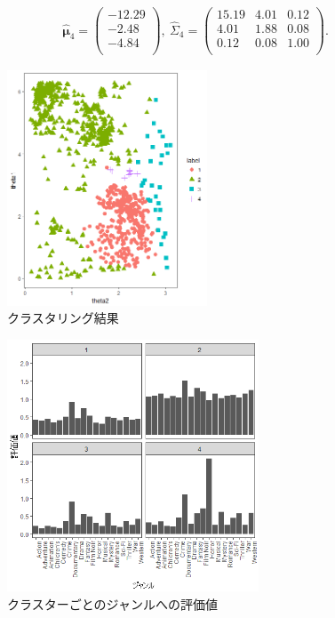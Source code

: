 \documentclass[a4paper,11pt]{jarticle}
\begin{document}
\begin{equation}
\begin{split}
\hat{\bm \mu}_4 = \begin{pmatrix} -12.29   \\ -2.48 \\ -4.84 \\ \end{pmatrix},\ 
\hat \Sigma_4 = \begin{pmatrix} 15.19 & 4.01 &  0.12 \\ 4.01 & 1.88 & 0.08 \\ 0.12 & 0.08 &1.00 \\ \end{pmatrix}.
\end{split}
\end{equation}

\begin{figure}[H]
\begin{center}
\includegraphics[clip,height= 70mm]{data/cluster_4.png}
\end{center}
 \vspace{-0.9cm}
\caption{クラスタリング結果}
\label{clusterplot}
\end{figure}

\begin{figure}[H]
\begin{center}
\includegraphics[clip,height= 75mm]{data/cluster_plot.png}
\end{center}
 \vspace{-0.9cm}
\caption{クラスターごとのジャンルへの評価値}
\label{clustergenre}
\end{figure}
\end{document}
